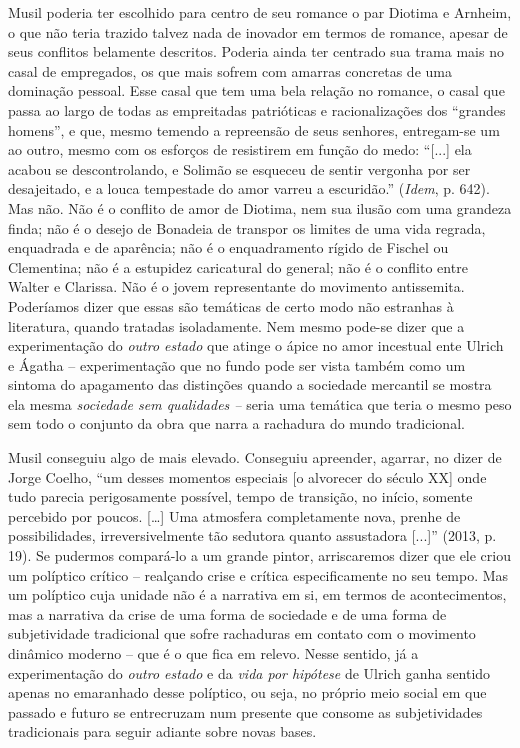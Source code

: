 Musil poderia ter escolhido para centro de seu romance o par Diotima e
Arnheim, o que não teria trazido talvez nada de inovador em termos de
romance, apesar de seus conflitos belamente descritos. Poderia ainda ter
centrado sua trama mais no casal de empregados, os que mais sofrem com
amarras concretas de uma dominação pessoal. Esse casal que tem uma bela
relação no romance, o casal que passa ao largo de todas as empreitadas
patrióticas e racionalizações dos ``grandes homens'', e que, mesmo
temendo a repreensão de seus senhores, entregam-se um ao outro, mesmo
com os esforços de resistirem em função do medo: ``{[}...{]} ela acabou
se descontrolando, e Solimão se esqueceu de sentir vergonha por ser
desajeitado, e a louca tempestade do amor varreu a escuridão.''
(\emph{Idem}, p. 642). Mas não. Não é o conflito de amor de Diotima, nem
sua ilusão com uma grandeza finda; não é o desejo de Bonadeia de
transpor os limites de uma vida regrada, enquadrada e de aparência; não
é o enquadramento rígido de Fischel ou Clementina; não é a estupidez
caricatural do general; não é o conflito entre Walter e Clarissa. Não é
o jovem representante do movimento antissemita. Poderíamos dizer que
essas são temáticas de certo modo não estranhas à literatura, quando
tratadas isoladamente. Nem mesmo pode-se dizer que a experimentação do
\emph{outro estado} que atinge o ápice no amor incestual ente Ulrich e
Ágatha -- experimentação que no fundo pode ser vista também como um
sintoma do apagamento das distinções quando a sociedade mercantil se
mostra ela mesma \emph{sociedade sem qualidades --} seria uma temática
que teria o mesmo peso sem todo o conjunto da obra que narra a rachadura
do mundo tradicional.

Musil conseguiu algo de mais elevado. Conseguiu apreender, agarrar, no
dizer de Jorge Coelho, ``um desses momentos especiais {[}o alvorecer do
século XX{]} onde tudo parecia perigosamente possível, tempo de
transição, no início, somente percebido por poucos. {[}\ldots{}{]} Uma
atmosfera completamente nova, prenhe de possibilidades,
irreversivelmente tão sedutora quanto assustadora {[}...{]}'' (2013, p.
19). Se pudermos compará-lo a um grande pintor, arriscaremos dizer que
ele criou um políptico crítico -- realçando crise e crítica
especificamente no seu tempo. Mas um políptico cuja unidade não é a
narrativa em si, em termos de acontecimentos, mas a narrativa da crise
de uma forma de sociedade e de uma forma de subjetividade tradicional
que sofre rachaduras em contato com o movimento dinâmico moderno -- que
é o que fica em relevo. Nesse sentido, já a experimentação do
\emph{outro estado} e da \emph{vida por hipótese} de Ulrich ganha
sentido apenas no emaranhado desse políptico, ou seja, no próprio meio
social em que passado e futuro se entrecruzam num presente que consome
as subjetividades tradicionais para seguir adiante sobre novas bases.

